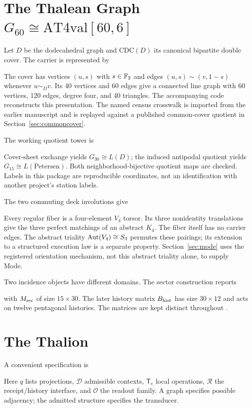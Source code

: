 \section{The Thalean Graph \texorpdfstring{$G_{60}\cong\mathrm{AT4val}[60,6]$}{G60 = AT4val[60,6]}}\label{sec:carrier}
Let $D$ be the dodecahedral graph and $\mathrm{CDC}(D)$ its canonical bipartite double cover. The carrier is represented by

The cover has vertices $(u,s)$ with $s\in\mathbb F_2$ and edges $(u,s)\sim(v,1-s)$ whenever $u\sim_Dv$. Its 40 vertices and 60 edges give a connected line graph with 60 vertices, 120 edges, degree four, and 40 triangles. The accompanying code reconstructs this presentation. The named census crosswalk is imported from the earlier manuscript \citep{cave2026becoming,psv2013} and is replayed against a published common-cover quotient in Section~\ref{sec:commoncover}.

The working quotient tower is

Cover-sheet exchange yields $G_{30}\cong L(D)$; the induced antipodal quotient yields $G_{15}\cong L(\mathrm{Petersen})$. Both neighborhood-bijective quotient maps are checked. Labels in this package are reproducible coordinates, not an identification with another project's station labels.

The two commuting deck involutions give

Every regular fiber is a four-element $V_4$ torsor. Its three nonidentity translations give the three perfect matchings of an abstract $K_4$. The fiber itself has no carrier edges. The abstract triality $\operatorname{Aut}(V_4)\cong S_3$ permutes these pairings; its extension to a structured execution law is a separate property. Section~\ref{sec:mode} uses the registered orientation mechanism, not this abstract triality alone, to supply Mode.

Two incidence objects have different domains. The sector construction reports

with $M_{\rm sec}$ of size $15\times30$. The later history matrix $B_{\rm hist}$ has size $30\times12$ and acts on twelve pentagonal histories. The matrices are kept distinct throughout \citep{cave2026becoming,historyconference}.





\section{The Thalion}\label{sec:thalion}

A convenient specification is

Here $q$ lists projections, $\mathcal D$ admissible contexts, $\mathsf T_e$ local operations, $\mathcal R$ the receipt/history interface, and $\mathcal O$ the readout family. A graph specifies possible adjacency; the admitted structure specifies the transducer.

